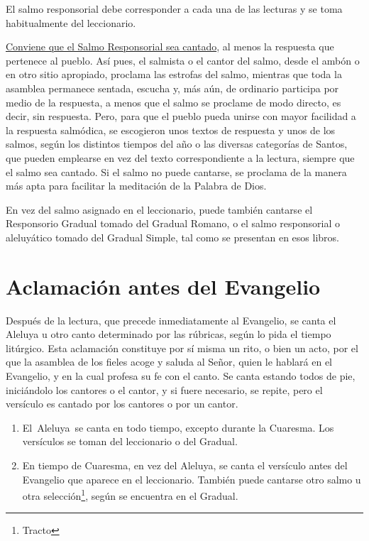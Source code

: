 \documentclass[letterpaper, 12pt]{book}
\begin{document}
    El salmo responsorial debe corresponder a cada una de las lecturas y se toma habitualmente del leccionario.\newline
    
    \underline{Conviene que el Salmo Responsorial sea cantado}, al menos la respuesta que pertenece al pueblo. As\'i pues, el salmista o el cantor del salmo, desde el amb\'on o en otro sitio apropiado, proclama las estrofas del salmo, mientras que toda la asamblea permanece sentada, escucha y, m\'as a\'un, de ordinario participa por medio de la respuesta, a menos que el salmo se proclame de modo directo, es decir, sin respuesta. Pero, para que el pueblo pueda unirse con mayor facilidad a la respuesta salm\'odica, se escogieron unos textos de respuesta y unos de los salmos, seg\'un los distintos tiempos del a\~no o las diversas categor\'ias de Santos, que pueden emplearse en vez del texto correspondiente a la lectura, siempre que el salmo sea cantado. Si el salmo no puede cantarse, se proclama de la manera m\'as apta para facilitar la meditaci\'on de la Palabra de Dios.\newline
    
    En vez del salmo asignado en el leccionario, puede tambi\'en cantarse el Responsorio Gradual tomado del Gradual Romano, o el salmo responsorial o aleluy\'atico tomado del Gradual Simple, tal como se presentan en esos libros.
    
    \section{Aclamaci\'on antes del Evangelio}
    Despu\'es de la lectura, que precede inmediatamente al Evangelio, se canta el Aleluya u otro canto determinado por las r\'ubricas, seg\'un lo pida el tiempo lit\'urgico. Esta aclamaci\'on constituye por s\'i misma un rito, o bien un acto, por el que la asamblea de los fieles acoge y saluda al Se\~nor, quien le hablar\'a en el Evangelio, y en la cual profesa su fe con el canto. Se canta estando todos de pie, inici\'andolo los cantores o el cantor, y si fuere necesario, se repite, pero el versículo es cantado por los cantores o por un cantor.
    
    \renewcommand{\theenumi}{\alph{enumi}}
    \begin{enumerate}
        \item El Aleluya se canta en todo tiempo, excepto durante la Cuaresma. Los versículos se toman del leccionario o del Gradual.
        \item En tiempo de Cuaresma, en vez del Aleluya, se canta el vers\'iculo antes del Evangelio que aparece en el leccionario. Tambi\'en puede cantarse otro salmo u otra selecci\'on\footnote{Tracto}, seg\'un se encuentra en el Gradual.
    \end{enumerate}
    
\end{document}

